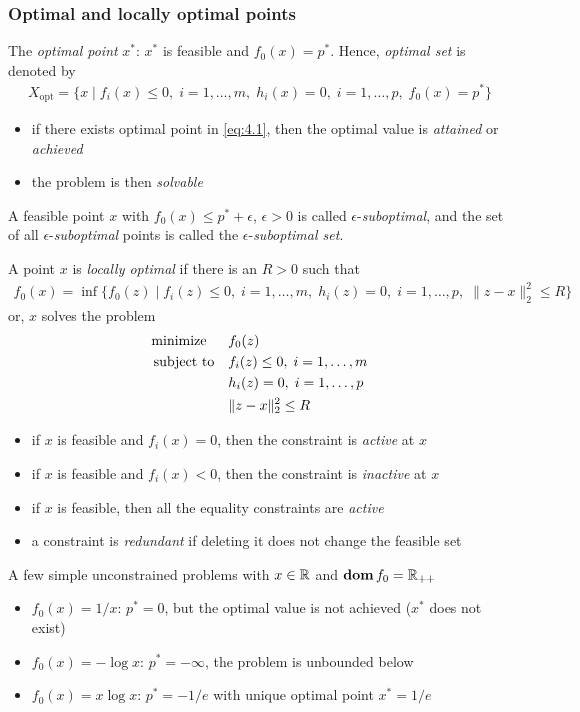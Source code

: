 \subsubsection{Optimal and locally optimal points}
The \textit{optimal point} $x^\ast$: $x^\ast$ is feasible and $f_0(x)=p^\ast$.
Hence, \textit{optimal set} is denoted by
\begin{align*}
  X_{\text{opt}}=\{x\mid f_i(x)\le 0,\;i=1,\dots,m,\;h_i(x)=0,\;i=1,\dots,p,\;f_0(x)=p^\ast\}
\end{align*}
\begin{itemize}
  \item if there exists optimal point in \eqref{eq:4.1}, then the optimal value is \textit{attained} or \textit{achieved}
  \item the problem is then \textit{solvable}
\end{itemize}
A feasible point $x$ with $f_0(x)\le p^\ast+\epsilon$, $\epsilon>0$ is called $\epsilon$-\textit{suboptimal}, and the set of all $\epsilon$-\textit{suboptimal} points is called the $\epsilon$-\textit{suboptimal set}.\par
A point $x$ is \textit{locally optimal} if there is an $R>0$ such that
\begin{align*}
  f_0(x)=\inf\{f_0(z)\mid f_i(z)\le 0,\;i=1,\dots,m,\;h_i(z)=0,\;i=1,\dots,p,\;\|z-x\|_2^2\le R\}
\end{align*}
or, $x$ solves the problem
\begin{align*}
  \text{minimize\;\;}\quad& f_0(z)\\
  \text{subject to}  \quad& f_i(z)\le 0,\;i=1,\dots,m\\
                          & h_i(z) =  0,\;i=1,\dots,p\\
                          & \|z-x\|_2^2\le R
\end{align*}
\begin{itemize}
  \item if $x$ is feasible and $f_i(x)=0$, then the constraint is \textit{active} at $x$
  \item if $x$ is feasible and $f_i(x)<0$, then the constraint is \textit{inactive} at $x$
  \item if $x$ is feasible, then all the equality constraints are \textit{active}
  \item a constraint is \textit{redundant} if deleting it does not change the feasible set
\end{itemize}
\begin{example}
  A few simple unconstrained problems with $x\in\mathbb{R}$ and $\mathop{\bf dom} f_0=\mathbb{R}_{++}$
  \begin{itemize}
    \item $f_0(x)=1/x$: $p^\ast=0$, but the optimal value is not achieved ($x^\ast$ does not exist)
    \item $f_0(x)=-\log x$: $p^\ast=-\infty$, the problem is unbounded below
    \item $f_0(x)=x\log x$: $p^\ast=-1/e$ with unique optimal point $x^\ast=1/e$
  \end{itemize}
\end{example}
